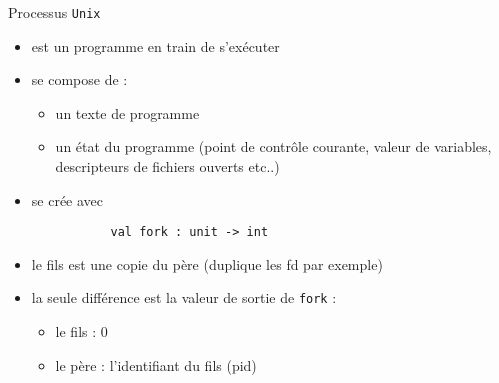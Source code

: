 \begin{frame}[fragile]{Processus \texttt{Unix}}

 \begin{itemize}[label=\small{}]
    \item est un programme en train de s'exécuter
    \item se compose de : 
     \begin{itemize}[label=]
        \item un texte de programme 
         \item un état du programme (point de contrôle courante, valeur de variables, descripteurs de fichiers ouverts etc..)
     \end{itemize}
    \item se crée avec  \begin{lstlisting}
           val fork : unit -> int 
      \end{lstlisting}
      \item le fils est une copie du père (duplique les fd par exemple)
      \item la seule différence est la valeur de sortie de \texttt{fork} : 
            \begin{itemize}[label=$-$]
                \item le fils : 0
                \item le père : l'identifiant du fils (pid)
            \end{itemize}
 \end{itemize}
\end{frame}

